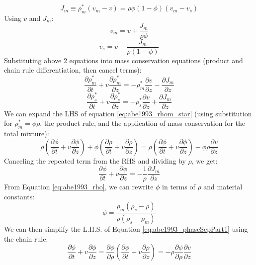 \begin{equation}
J_m \equiv \rho_m^\ast (v_m-v) = \rho \phi (1-\phi)(v_m-v_s)
\end{equation}
Using $v$ and $J_m$:
\begin{equation}
v_m = v + \frac{J_m}{\rho \phi}
\end{equation}
\begin{equation}
v_s = v - \frac{J_m}{\rho (1-\phi)}
\end{equation}
Substituting above 2 equations into mass conservation equations (product and chain rule differentiation, then cancel terms):
\begin{equation}
\frac{\partial \rho_m^\ast}{\partial t} + v \frac{\partial \rho_m^\ast}{\partial z} = -\rho_m^\ast \frac{\partial v}{\partial z} - \frac{\partial J_m}{\partial z}
\label{eq:abe1993_rhom_star}
\end{equation}
\begin{equation}
\frac{\partial \rho_s^\ast}{\partial t} + v \frac{\partial \rho_s^\ast}{\partial z} = -\rho_s^\ast \frac{\partial v}{\partial z} + \frac{\partial J_m}{\partial z}
\label{eq:abe1993_rhos_star}
\end{equation}
We can expand the LHS of equation \ref{eq:abe1993_rhom_star} (using substitution for $\rho_m^\ast=\phi\rho$, the product rule, and the application of mass conservation for the total mixture):
\begin{equation}
  \rho(\frac{\partial \phi}{\partial t} + v \frac{\partial \phi}{\partial z}) + \phi(\frac{\partial \rho}{\partial t} + v \frac{\partial \rho}{\partial z})= \rho(\frac{\partial \phi}{\partial t} + v \frac{\partial \phi}{\partial z})  - \phi\rho \frac{\partial v}{\partial z}
\end{equation}
Canceling the repeated term from the RHS and dividing by $\rho$, we get:
\begin{equation}
\frac{\partial \phi}{\partial t} + v \frac{\partial \phi}{\partial z} = - \frac{1}{\rho} \frac{\partial J_m}{\partial z}
\label{eq:abe1993_phaseSepPart1}
\end{equation}
From Equation \ref{eq:abe1993_rho}, we can rewrite $\phi$ in terms of $\rho$ and material constants:
\begin{equation}
\phi = \frac{\rho_m ( \rho_s - \rho)}{\rho ( \rho_s-\rho_m)}
\end{equation}
We can then simplify the L.H.S. of Equation \ref{eq:abe1993_phaseSepPart1} using the chain rule:
\begin{equation}
  \frac{\partial \phi}{\partial t} + v \frac{\partial \phi}{\partial z} = 
  \frac{\partial \phi}{\partial \rho} ( \frac{\partial \phi}{\partial t} + v \frac{\partial \rho}{\partial z}) = 
  -\rho \frac{\partial \phi}{\partial \rho}\frac{\partial v}{\partial z}
\label{eq:abe1993_phaseSepPart2}
\end{equation}
